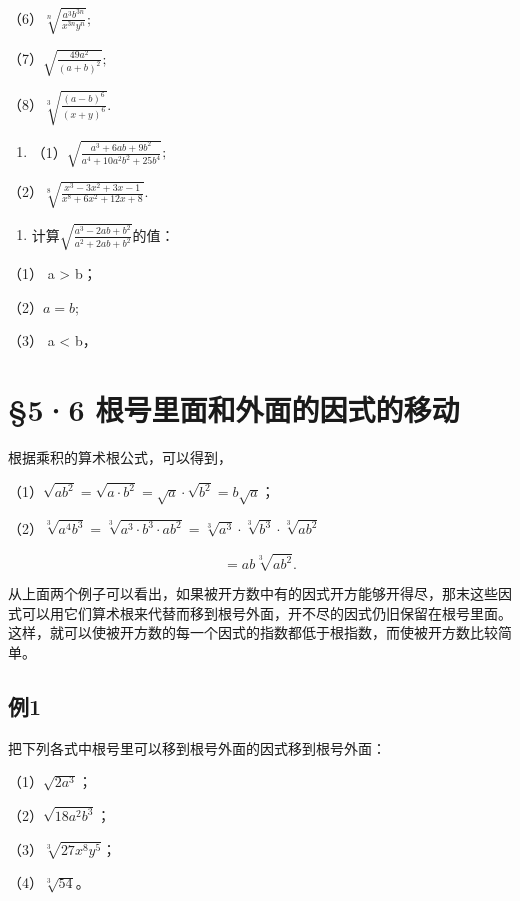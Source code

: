 （6）\(\sqrt[n]{\frac{a^3b^{3n}}{x^{3n}y^n}};\)

（7）\(\sqrt{\frac{49a^2}{(a + b)^2}};\)

（8）\(\sqrt[3]{\frac{(a - b)^6}{(x + y)^6}}.\)

\begin{enumerate}[start=3]
\item
  （1）\(\sqrt{\frac{a^3 + 6ab + 9b^2}{a^4 + 10a^2b^2 + 25b^4}};\)
\end{enumerate}

（2）\(\sqrt[8]{\frac{x^3 - 3x^2 + 3x - 1}{x^8 + 6x^2 + 12x + 8}}.\)

\begin{enumerate}[start=4]
\item
  计算\(\sqrt{\frac{a^3 - 2ab + b^2}{a^2 + 2ab + b^2}}\)的值：
\end{enumerate}

（1） a \textgreater{} b；

（2）\(a = b;\)

（3） a \textless{} b，

\section{§5·6 根号里面和外面的因式的移动}

根据乘积的算术根公式，可以得到，

（1）\(\sqrt{ab^2} = \sqrt{a \cdot b^2} = \sqrt{a} \cdot \sqrt{b^2} = b\sqrt{a}\)；

（2）\(\sqrt[3]{a^4b^3} = \sqrt[3]{a^3\cdot b^3\cdot a b^2} = \sqrt[3]{a^3}\cdot \sqrt[3]{b^3}\cdot \sqrt[3]{a b^2}\)

\[
= a b \sqrt[3]{a b ^ {2}}.
\]

从上面两个例子可以看出，如果被开方数中有的因式开方能够开得尽，那末这些因式可以用它们算术根来代替而移到根号外面，开不尽的因式仍旧保留在根号里面。这样，就可以使被开方数的每一个因式的指数都低于根指数，而使被开方数比较简单。

\subsection{例1}

把下列各式中根号里可以移到根号外面的因式移到根号外面：

（1）\(\sqrt{2a^3}\)；

（2）\(\sqrt{18a^2b^3}\)；

（3）\(\sqrt[3]{27x^8y^5}\)；

（4）\(\sqrt[3]{54}\)。

